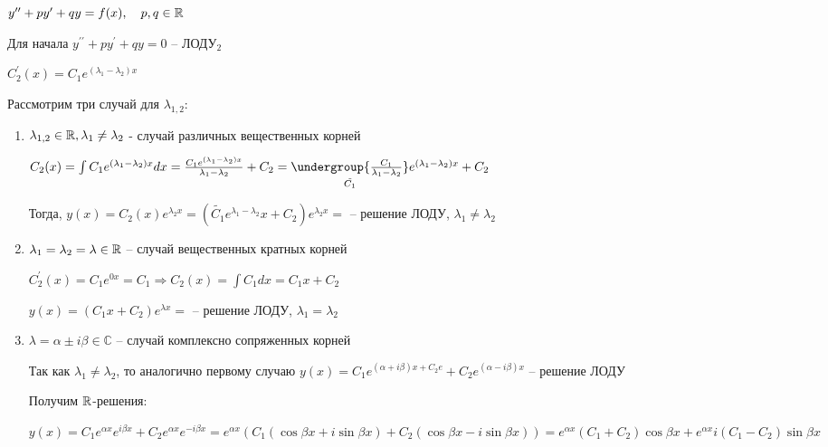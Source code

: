 \documentclass[12pt]{article}
\begin{document}
    \Mem $y^{\prime\prime} + py^\prime + qy = f(x), \quad p, q \in \mathbb{R}$

    Для начала $y^{\prime\prime} + py^\prime + qy = 0$ -- ЛОДУ$_2$

    $C^\prime_2 (x) = C_1 e^{(\lambda_1 - \lambda_2)x}$

    Рассмотрим три случай для $\lambda_{1,2}$:

    \hypertarget{ldesgdifferentrealsolutions}{}

    \begin{enumerate}
        \item $\lambda_{1,2} \in \mathbb{R}, \lambda_1 \neq \lambda_2$ - случай различных вещественных корней

        $C_2(x) = \int C_1 e^{(\lambda_1 - \lambda_2)x} dx = \frac{C_1 e^{(\lambda_1 - \lambda_2)x}}{\lambda_1 - \lambda_2} + C_2 =
        \underset{\tilde{C_1}}{\undergroup{\frac{C_1}{\lambda_1 - \lambda_2}}} e^{(\lambda_1 - \lambda_2)x} + C_2$

        Тогда, $y(x) = C_2(x) e^{\lambda_2 x} = (\tilde{C_1}e^{\lambda_1 - \lambda_2}x + C_2)e^{\lambda_2 x} = $ -- решение ЛОДУ, $\lambda_1 \neq \lambda_2$

        \hypertarget{ldesgequalrealsolutions}{}

        \item $\lambda_1 = \lambda_2 = \lambda \in \mathbb{R}$ -- случай вещественных кратных корней

        $C_2^\prime (x) = C_1 e^{0x} = C_1 \Longrightarrow C_2(x) = \int C_1 dx = C_1 x + C_2$

        $y(x) = (C_1 x + C_2)e^{\lambda x} = $ -- решение ЛОДУ, $\lambda_1 = \lambda_2$

        \hypertarget{ldesgcomplexsolutions}{}

        \item $\lambda = \alpha \pm i \beta \in \mathbb{C}$ -- случай комплексно сопряженных корней

        Так как $\lambda_1 \neq \lambda_2$, то аналогично первому случаю $y(x) = C_1 e^{(\alpha + i \beta)x + C_2 e} + C_2 e^{(\alpha - i \beta) x}$ -- решение ЛОДУ

        Получим $\mathbb{R}$-решения:

        $y(x) = C_1 e^{\alpha x} e^{i\beta x} + C_2 e^{\alpha x} e^{-i\beta x} = e^{\alpha x} (C_1 (\cos\beta x + i\sin\beta x) + C_2 (\cos\beta x - i\sin \beta x)) =
        e^{\alpha x} (C_1 + C_2) \cos\beta x + e^{\alpha x} i (C_1 - C_2) \sin\beta x$


\end{enumerate}
\end{document}
